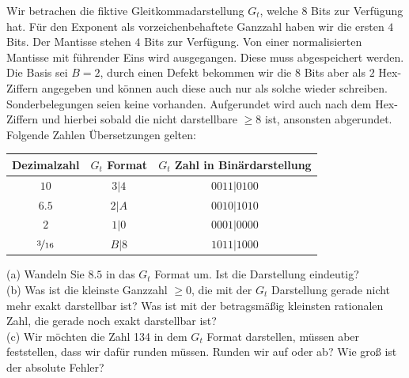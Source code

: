 \documentclass{scrartcl}
\begin{document}
	Wir betrachen die fiktive Gleitkommadarstellung $G_t$, welche $8$ Bits zur Verfügung hat. Für den Exponent als vorzeichenbehaftete Ganzzahl haben wir die ersten $4$ Bits. Der Mantisse stehen $4$ Bits zur Verfügung. Von einer normalisierten Mantisse mit führender Eins wird ausgegangen. Diese muss  abgespeichert werden. Die Basis sei $B = 2$, durch einen Defekt bekommen wir die $8$ Bits aber als $2$ Hex-Ziffern angegeben und können auch diese auch nur als solche wieder schreiben. Sonderbelegungen seien keine vorhanden.
	\n
	Aufgerundet wird auch nach dem Hex-Ziffern und hierbei sobald die nicht darstellbare $\ge 8$ ist, ansonsten abgerundet.
	\n
	 Folgende Zahlen Übersetzungen gelten: \n
	\begin{tabular}{ccc}
		Dezimalzahl & $G_t$ Format & $G_t$ Zahl in Binärdarstellung \\ \toprule
		$10$ 	& $3|4$ 	& $0011|0100$\\
		$6.5$ 	& $2|A$ 	& $0010|1010$ \\
		$2$ 	& $1|0$ 	& $0001|0000$ \\
		$\nicefrac{3}{16}$ 	& $B|8$		& $1011|1000$
	\end{tabular}
	\n
	(a) 
	Wandeln Sie $8.5$ in das $G_t$ Format um. Ist die Darstellung eindeutig?
	\lbreak
	\\
	(b) 
	Was ist die kleinste Ganzzahl $\ge 0$, die mit der $G_t$ Darstellung gerade nicht mehr exakt darstellbar ist?
	\n 
	Was ist mit der betragsmäßig kleinsten rationalen Zahl, die gerade noch exakt darstellbar ist?
	\lbreak
	\\
	(c) 
	Wir möchten die Zahl 134 in dem $G_t$ Format darstellen, müssen aber feststellen, dass wir dafür runden müssen. Runden wir auf oder ab? Wie groß ist der absolute Fehler?
	
\end{document}
